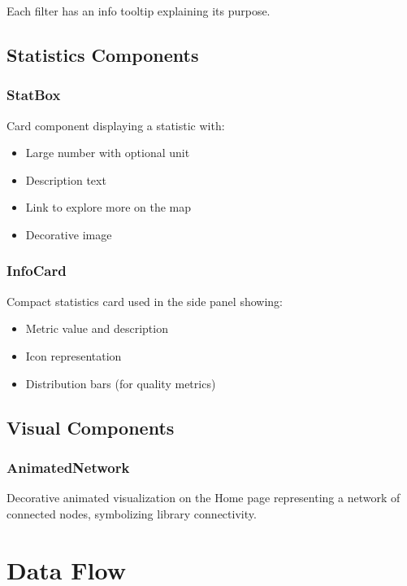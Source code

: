 \documentclass[11pt,a4paper]{article}
\begin{document}
Each filter has an info tooltip explaining its purpose.

\subsection{Statistics Components}

\subsubsection{StatBox}
Card component displaying a statistic with:
\begin{itemize}
    \item Large number with optional unit
    \item Description text
    \item Link to explore more on the map
    \item Decorative image
\end{itemize}

\subsubsection{InfoCard}
Compact statistics card used in the side panel showing:
\begin{itemize}
    \item Metric value and description
    \item Icon representation
    \item Distribution bars (for quality metrics)
\end{itemize}

\subsection{Visual Components}

\subsubsection{AnimatedNetwork}
Decorative animated visualization on the Home page representing a network of connected nodes, symbolizing library connectivity.

\section{Data Flow}
\end{document}
